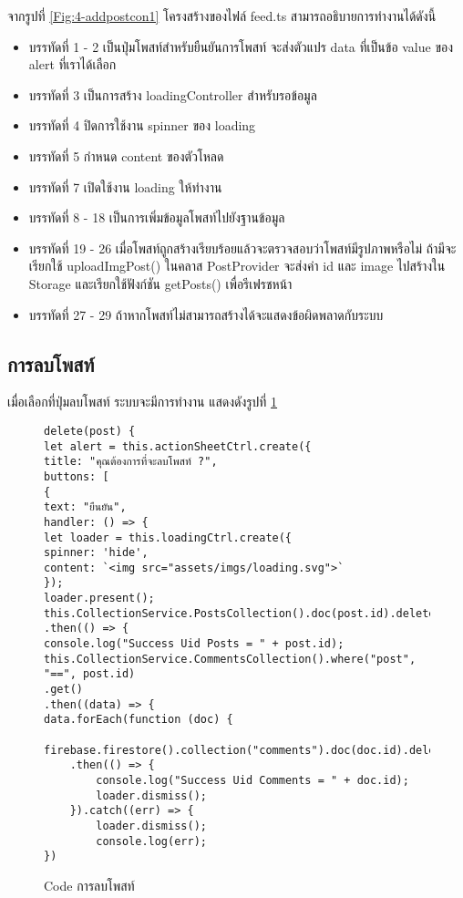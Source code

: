 	จากรูปที่ \ref{Fig:4-addpostcon1} โครงสร้างของไฟล์ feed.ts สามารถอธิบายการทำงานได้ดังนี้
	\begin{itemize}[label={--}]
	\item บรรทัดที่ 1 - 2 เป็นปุ่มโพสท์สำหรับยืนยันการโพสท์ จะส่งตัวแปร data ที่เป็นข้อ value ของ alert ที่เราได้เลือก
	\item บรรทัดที่ 3 เป็นการสร้าง loadingController สำหรับรอข้อมูล
	\item บรรทัดที่ 4 ปิดการใช้งาน spinner ของ loading
	\item บรรทัดที่ 5 กำหนด content ของตัวโหลด
	\item บรรทัดที่ 7 เปิดใช้งาน loading ให้ทำงาน
	\item บรรทัดที่ 8 - 18 เป็นการเพิ่มข้อมูลโพสท์ไปยังฐานข้อมูล
	\item บรรทัดที่ 19 - 26 เมื่อโพสท์ถูกสร้างเรียบร้อยแล้วจะตรวจสอบว่าโพสท์มีรูปภาพหรือไม่ ถ้ามีจะเรียกใช้ uploadImgPost() ในคลาส PostProvider จะส่งค่า id และ image ไปสร้างใน Storage และเรียกใช้ฟังก์ชัน getPosts() เพื่อรีเฟรชหน้า
	\item บรรทัดที่ 27 - 29 ถ้าหากโพสท์ไม่สามารถสร้างได้จะแสดงข้อผิดพลาดกับระบบ
	\end{itemize}
	\newpage



\subsection{การลบโพสท์}
เมื่อเลือกที่ปุ่มลบโพสท์ ระบบจะมีการทำงาน แสดงดังรูปที่ \ref{Fig:4-deletepost}

\begin{figure}[H]
{\lstset{language=Pascal}
\begin{lstlisting}
delete(post) {
let alert = this.actionSheetCtrl.create({
title: "คุณต้องการที่จะลบโพสท์ ?",
buttons: [
{
text: "ยืนยัน",
handler: () => {
let loader = this.loadingCtrl.create({
spinner: 'hide',
content: `<img src="assets/imgs/loading.svg">`
});
loader.present();
this.CollectionService.PostsCollection().doc(post.id).delete()
.then(() => {
console.log("Success Uid Posts = " + post.id);
this.CollectionService.CommentsCollection().where("post", "==", post.id)
.get()
.then((data) => {
data.forEach(function (doc) {
	firebase.firestore().collection("comments").doc(doc.id).delete()
	.then(() => {
		console.log("Success Uid Comments = " + doc.id);
		loader.dismiss();
	}).catch((err) => {
		loader.dismiss();
		console.log(err);
})
\end{lstlisting}}
\caption{Code การลบโพสท์}
\label{Fig:4-deletepost}
\end{figure}
\newpage

